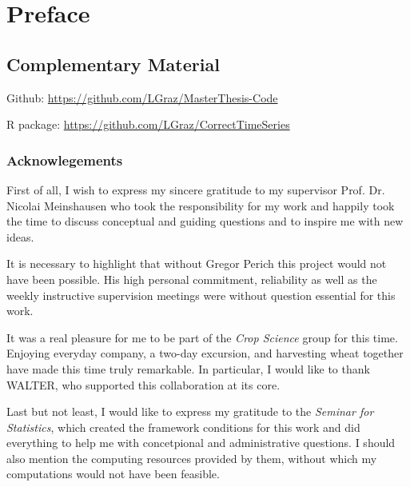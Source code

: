\chapter*{Preface}

\section*{Complementary Material}


Github: \url{https://github.com/LGraz/MasterThesis-Code} 

R package: \url{https://github.com/LGraz/CorrectTimeSeries } 


\subsection*{Acknowlegements}
First of all, I wish to express my sincere gratitude to my supervisor Prof. Dr. Nicolai Meinshausen who took the responsibility for my work and happily took the time to discuss conceptual and guiding questions and to inspire me with new ideas. 

It is necessary to highlight that without Gregor Perich this project would not have been possible. His high personal commitment, reliability as well as the weekly instructive supervision meetings were without question essential for this work. 

It was a real pleasure for me to be part of the \textit{Crop Science} group for this time. Enjoying everyday company, a two-day excursion, and harvesting wheat together have made this time truly remarkable. In particular, I would like to thank WALTER, who supported this collaboration at its core.  

Last but not least, I would like to express my gratitude to the \textit{Seminar for Statistics}, which created the framework conditions for this work and did everything to help me with concetpional and administrative questions. I should also mention the computing resources provided by them, without which my computations would not have been feasible.


